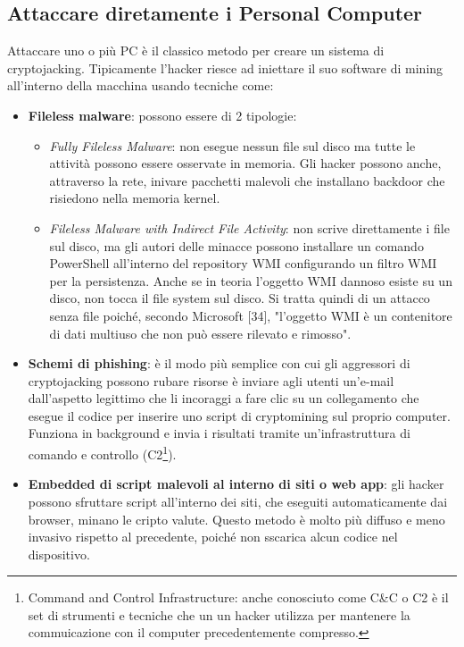 \documentclass[12pt,a4paper]{article}
\begin{document}
\subsection{Attaccare diretamente i Personal Computer}
Attaccare uno o più PC è il classico metodo per creare un sistema di
cryptojacking. Tipicamente l'hacker riesce ad iniettare il suo software di
mining all'interno della macchina usando tecniche come:
\begin{itemize}
    \item \textbf{Fileless malware}: possono essere di 2 tipologie:
    \begin{itemize}
        \item \textit{Fully Fileless Malware}: non esegue nessun file sul disco
        ma tutte le attività possono essere osservate in memoria. Gli hacker
        possono anche, attraverso la rete, inivare pacchetti malevoli che
        installano backdoor che risiedono nella memoria kernel.
        \item \textit{Fileless Malware with Indirect File Activity}: non scrive
        direttamente i file sul disco, ma gli autori delle minacce possono
        installare un comando PowerShell all'interno del repository WMI
        configurando un filtro WMI per la persistenza. Anche se in teoria
        l'oggetto WMI dannoso esiste su un disco, non tocca il file system sul
        disco. Si tratta quindi di un attacco senza file poiché, secondo
        Microsoft [34], "l'oggetto WMI è un contenitore di dati multiuso che non
        può essere rilevato e rimosso".\cite{FMW}
    \end{itemize}
    \item \textbf{Schemi di phishing}: è il modo più semplice con cui gli
        aggressori di cryptojacking possono rubare risorse è inviare agli utenti
        un'e-mail dall'aspetto legittimo che li incoraggi a fare clic su un
        collegamento che esegue il codice per inserire uno script di
        cryptomining sul proprio computer. Funziona in background e invia i
        risultati tramite un'infrastruttura di comando e controllo
        (C2\footnote{Command and Control Infrastructure: anche conosciuto come
        C\&C o C2 è il set di strumenti e tecniche che un un hacker utilizza per
        mantenere la commuicazione con il computer precedentemente compresso.}).
    \item \textbf{Embedded di script malevoli al interno di siti o web app}: gli
        hacker possono sfruttare script all'interno dei siti, che eseguiti
        automaticamente dai browser, minano le cripto valute. Questo metodo è
        molto più diffuso e meno invasivo rispetto al precedente, poiché non
        sscarica alcun codice nel dispositivo.
\end{itemize}
\end{document}
